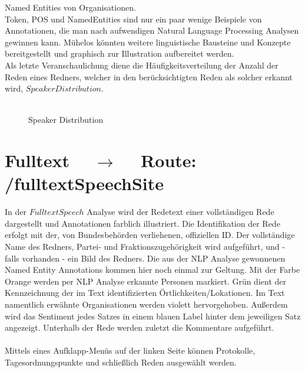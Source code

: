\documentclass[10pt]{report}
\begin{document}
\noindent Named Entities von Organisationen. \\

\noindent Token, POS und NamedEntities sind nur ein paar wenige Beispiele von Annotationen, die man nach aufwendigen Natural Language Processing Analysen gewinnen kann. Mühelos könnten weitere linguistische Bausteine und Konzepte bereitgestellt und graphisch zur Illustration aufbereitet werden. \\

\noindent Als letzte Veranschaulichung diene die Häufigkeitsverteilung der Anzahl der Reden eines Redners, welcher in den berücksichtigten Reden als solcher erkannt wird, $Speaker Distribution$. \\\\
 
 \begin{figure}[H]
	\begin{center}		
  	 \end{center}
	\caption{Speaker Distribution}	
 \end{figure}


\section{Fulltext  $\quad\rightarrow\quad$  Route:  /fulltextSpeechSite}    
In der $Fulltext Speech$ Analyse wird der Redetext einer vollständigen Rede dargestellt und Annotationen farblich illustriert. 
Die Identifikation der Rede erfolgt mit der, von Bundesbehörden verliehenen, offiziellen ID. 
Der vollständige Name des Redners, Partei- und Fraktionszugehörigkeit wird aufgeführt, und - falls vorhanden - ein Bild des Redners. 
Die aus der NLP Analyse gewonnenen Named Entity Annotations kommen hier noch einmal zur Geltung.
Mit der Farbe Orange werden per NLP Analyse erkannte Personen markiert. 
Grün dient der Kennzeichnung der im Text identifizierten Örtlichkeiten/Lokationen. 
Im Text namentlich erwähnte Organisationen werden violett hervorgehoben.
Außerdem wird das Sentiment jedes Satzes in einem blauen Label hinter dem jeweiligen Satz angezeigt.
Unterhalb der Rede werden zuletzt die Kommentare aufgeführt.\\\\ 
Mittels eines Aufklapp-Menüs auf der linken Seite können Protokolle, Tagesordnungspunkte und schließlich Reden ausgewählt werden.\\\\
\end{document}

